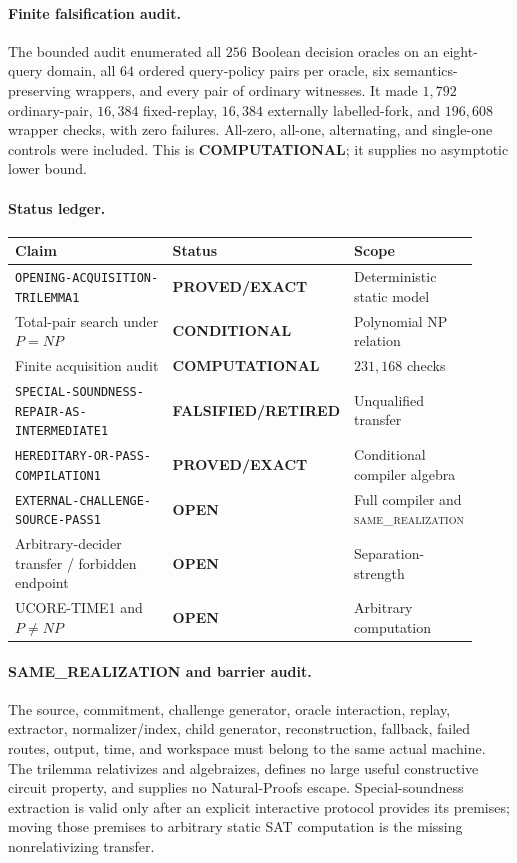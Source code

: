 \documentclass[11pt]{article}
\newcommand{\statusproved}{\textcolor{proved}{\textbf{PROVED/EXACT}}}
\newcommand{\statusopen}{\textcolor{openstatus}{\textbf{OPEN}}}
\newcommand{\statusretired}{\textcolor{retired}{\textbf{FALSIFIED/RETIRED}}}
\newcommand{\same}{\textnormal{\textsc{same\_realization}}}
\begin{document}
\paragraph{Finite falsification audit.}
The bounded audit enumerated all $256$ Boolean decision oracles on an
eight-query domain, all $64$ ordered query-policy pairs per oracle, six
semantics-preserving wrappers, and every pair of ordinary witnesses.  It made
$1{,}792$ ordinary-pair, $16{,}384$ fixed-replay, $16{,}384$ externally
labelled-fork, and $196{,}608$ wrapper checks, with zero failures.  All-zero,
all-one, alternating, and single-one controls were included.  This is
\textbf{COMPUTATIONAL}; it supplies no asymptotic lower bound.

\paragraph{Status ledger.}
\begin{center}\scriptsize
\begin{tabular}{>{\raggedright\arraybackslash}p{0.43\linewidth}>{\raggedright\arraybackslash}p{0.22\linewidth}>{\raggedright\arraybackslash}p{0.27\linewidth}}
\toprule
Claim & Status & Scope\\ \midrule
\texttt{OPENING-ACQUISITION-TRILEMMA1} & \statusproved & Deterministic static model\\
Total-pair search under $P=NP$ & \textbf{CONDITIONAL} & Polynomial NP relation\\
Finite acquisition audit & \textbf{COMPUTATIONAL} & $231{,}168$ checks\\
\texttt{SPECIAL-SOUNDNESS-REPAIR-AS-INTERMEDIATE1} & \statusretired & Unqualified transfer\\
\texttt{HEREDITARY-OR-PASS-COMPILATION1} & \statusproved & Conditional compiler algebra\\
\texttt{EXTERNAL-CHALLENGE-SOURCE-PASS1} & \statusopen & Full compiler and \same\\
Arbitrary-decider transfer / forbidden endpoint & \statusopen & Separation-strength\\
UCORE-TIME1 and $P\ne NP$ & \statusopen & Arbitrary computation\\
\bottomrule
\end{tabular}
\end{center}

\paragraph{SAME\_REALIZATION and barrier audit.}
The source, commitment, challenge generator, oracle interaction, replay,
extractor, normalizer/index, child generator, reconstruction, fallback,
failed routes, output, time, and workspace must belong to the same actual
machine.  The trilemma relativizes and algebraizes, defines no large useful
constructive circuit property, and supplies no Natural-Proofs escape.
Special-soundness extraction is valid only after an explicit interactive
protocol provides its premises; moving those premises to arbitrary static SAT
computation is the missing nonrelativizing transfer.
\end{document}
